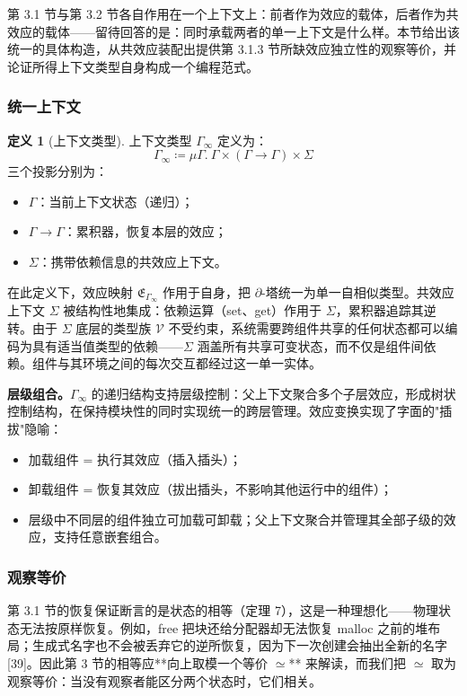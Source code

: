 \documentclass[11pt,a4paper]{article}
\theoremstyle{plain}
\theoremstyle{definition}
\newtheorem{definition}{定义}
\theoremstyle{remark}
\begin{document}
第 3.1 节与第 3.2 节各自作用在一个上下文上：前者作为效应的载体，后者作为共效应的载体——留待回答的是：同时承载两者的单一上下文是什么样。本节给出该统一的具体构造，从共效应装配出提供第 3.1.3 节所缺效应独立性的观察等价，并论证所得上下文类型自身构成一个编程范式。

\subsubsection{统一上下文}

\begin{definition}[上下文类型]
上下文类型 $\Gamma_\infty$ 定义为：
\[
\Gamma_\infty \coloneqq \mu\Gamma.\ \Gamma \times (\Gamma \to \Gamma) \times \Sigma \tag{31}
\]
三个投影分别为：
\begin{itemize}
\item $\Gamma$：当前上下文状态（递归）；
\item $\Gamma \to \Gamma$：累积器，恢复本层的效应；
\item $\Sigma$：携带依赖信息的共效应上下文。
\end{itemize}
\end{definition}

在此定义下，效应映射 $\mathfrak{E}_{\Gamma_\infty}$ 作用于自身，把 $\partial$-塔统一为单一自相似类型。共效应上下文 $\Sigma$ 被结构性地集成：依赖运算（set、get）作用于 $\Sigma$，累积器追踪其逆转。由于 $\Sigma$ 底层的类型族 $\mathcal{V}$ 不受约束，系统需要跨组件共享的任何状态都可以编码为具有适当值类型的依赖——$\Sigma$ 涵盖所有共享可变状态，而不仅是组件间依赖。组件与其环境之间的每次交互都经过这一单一实体。

\textbf{层级组合。}$\Gamma_\infty$ 的递归结构支持层级控制：父上下文聚合多个子层效应，形成树状控制结构，在保持模块性的同时实现统一的跨层管理。效应变换实现了字面的"插拔"隐喻：
\begin{itemize}
\item 加载组件 = 执行其效应（插入插头）；
\item 卸载组件 = 恢复其效应（拔出插头，不影响其他运行中的组件）；
\item 层级中不同层的组件独立可加载可卸载；父上下文聚合并管理其全部子级的效应，支持任意嵌套组合。
\end{itemize}

\subsubsection{观察等价}

第 3.1 节的恢复保证断言的是状态的相等（定理 7），这是一种理想化——物理状态无法按原样恢复。例如，free 把块还给分配器却无法恢复 malloc 之前的堆布局；生成式名字也不会被丢弃它的逆所恢复，因为下一次创建会抽出全新的名字 [39]。因此第 3 节的相等应**向上取模一个等价 $\simeq$** 来解读，而我们把 $\simeq$ 取为观察等价：当没有观察者能区分两个状态时，它们相关。
\end{document}
